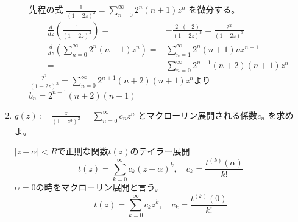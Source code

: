 \documentclass[12pt,b5paper]{ltjsarticle}
\begin{document}
\begin{enumerate}
\begin{enumerate}
              先程の式
              $\frac{1}{(1-2z)^2}
              = \sum_{n=0}^{\infty}2^{n}(n+1)z^{n}$
              を微分する。
              \begin{align}
                \frac{d}{dz}\left(\frac{1}{(1-2z)^2}\right)
               =& -\frac{2\cdot(-2)}{(1-2z)^3}
               = \frac{2^2}{(1-2z)^3}\\
               \frac{d}{dz}\left(\sum_{n=0}^{\infty}2^{n}(n+1)z^{n}\right)
               =& \sum_{n=1}^{\infty}2^{n}(n+1)nz^{n-1}\\
               =& \sum_{n=0}^{\infty}2^{n+1}(n+2)(n+1)z^{n}
              \end{align}
              $\frac{2^2}{(1-2z)^3} = \sum_{n=0}^{\infty}2^{n+1}(n+2)(n+1)z^{n}$より
              \underline{$b_n=2^{n-1}(n+2)(n+1)$}
       \end{enumerate}
       \hrulefill
 \item %

       $\displaystyle
       g(z) := \frac{z}{(1-z^3)^2}
       =\sum_{n=0}^{\infty}c_nz^n$
       とマクローリン展開される係数$c_n$
       を求めよ。

       \dotfill

       $\rvert z-\alpha \lvert <R$で正則な関数$t(z)$のテイラー展開
       \begin{equation}
        t(z)=\sum_{k=0}^{\infty}c_k(z-\alpha)^k, \quad c_k=\frac{t^{(k)}(\alpha)}{k!}
       \end{equation}
       $\alpha=0$の時をマクローリン展開と言う。
       \begin{equation}
        t(z)=\sum_{k=0}^{\infty}c_{k}z^k, \quad c_k=\frac{t^{(k)}(0)}{k!}
       \end{equation}

       \dotfill


\end{enumerate}
\end{document}
